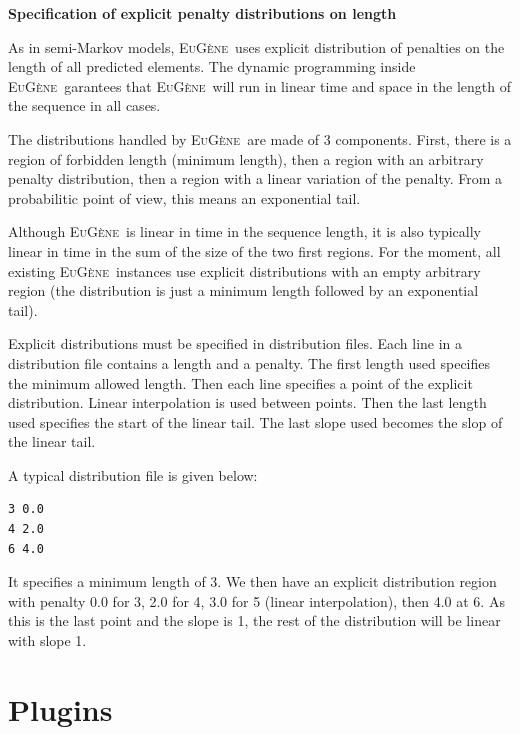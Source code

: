 \documentclass[a4paper,titlepage]{report}
\newcommand{\EuGene}{\textsc{EuG\`ene}}
\begin{document}
{\bf Specification of explicit penalty distributions on length}

As in semi-Markov models, \EuGene\ uses explicit distribution of
penalties on the length of all predicted elements. The dynamic
programming inside \EuGene\ garantees that \EuGene\ will run in linear
time and space in the length of the sequence in all cases.

The distributions handled by \EuGene\ are made of 3 components. First,
there is a region of forbidden length (minimum length), then a region
with an arbitrary penalty distribution, then a region with a linear
variation of the penalty. From a probabilitic point of view, this means
an exponential tail.

Although \EuGene\ is linear in time in the sequence length, it is also
typically linear in time in the sum of the size of the two first
regions. For the moment, all existing \EuGene\ instances use explicit
distributions with an empty arbitrary region (the distribution is just
a minimum length followed by an exponential tail).

Explicit distributions must be specified in distribution files. Each
line in a distribution file contains a length and a penalty. The first
length used specifies the minimum allowed length. Then each line
specifies a point of the explicit distribution. Linear interpolation
is used between points. Then the last length used specifies the start
of the linear tail. The last slope used becomes the slop of the linear
tail.

A
typical distribution file is given below:
\begin{Verbatim}
3 0.0
4 2.0
6 4.0
\end{Verbatim}

It specifies a minimum length of 3. We then have an explicit
distribution region with penalty 0.0 for 3, 2.0 for 4, 3.0 for 5
(linear interpolation), then 4.0 at 6. As this is the last point
and the slope is 1, the rest of the distribution will be linear
with slope 1.

\section{Plugins}
\label{plug}
\end{document}
